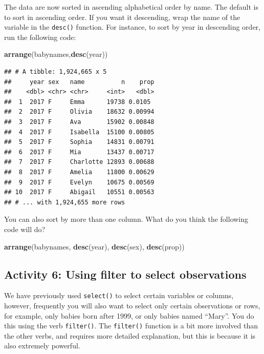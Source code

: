 \documentclass[]{book}
\newenvironment{Shaded}{\begin{snugshade}}{\end{snugshade}}
\newcommand{\KeywordTok}[1]{\textcolor[rgb]{0.13,0.29,0.53}{\textbf{#1}}}
\newcommand{\NormalTok}[1]{#1}
\begin{document}
The data are now sorted in ascending alphabetical order by name. The default is to sort in ascending order. If you want it descending, wrap the name of the variable in the \texttt{desc()} function. For instance, to sort by year in descending order, run the following code:

\begin{Shaded}
\begin{Highlighting}[]
\KeywordTok{arrange}\NormalTok{(babynames,}\KeywordTok{desc}\NormalTok{(year)) }
\end{Highlighting}
\end{Shaded}

\begin{verbatim}
## # A tibble: 1,924,665 x 5
##     year sex   name          n    prop
##    <dbl> <chr> <chr>     <int>   <dbl>
##  1  2017 F     Emma      19738 0.0105 
##  2  2017 F     Olivia    18632 0.00994
##  3  2017 F     Ava       15902 0.00848
##  4  2017 F     Isabella  15100 0.00805
##  5  2017 F     Sophia    14831 0.00791
##  6  2017 F     Mia       13437 0.00717
##  7  2017 F     Charlotte 12893 0.00688
##  8  2017 F     Amelia    11800 0.00629
##  9  2017 F     Evelyn    10675 0.00569
## 10  2017 F     Abigail   10551 0.00563
## # ... with 1,924,655 more rows
\end{verbatim}

You can also sort by more than one column. What do you think the following code will do?

\begin{Shaded}
\begin{Highlighting}[]
\KeywordTok{arrange}\NormalTok{(babynames, }\KeywordTok{desc}\NormalTok{(year), }\KeywordTok{desc}\NormalTok{(sex), }\KeywordTok{desc}\NormalTok{(prop)) }
\end{Highlighting}
\end{Shaded}

\hypertarget{activity-6-using-filter-to-select-observations}{%
\subsection{Activity 6: Using filter to select observations}\label{activity-6-using-filter-to-select-observations}}

We have previously used \texttt{select()} to select certain variables or columns, however, frequently you will also want to select only certain observations or rows, for example, only babies born after 1999, or only babies named ``Mary''. You do this using the verb \texttt{filter()}. The \texttt{filter()} function is a bit more involved than the other verbs, and requires more detailed explanation, but this is because it is also extremely powerful.
\end{document}
